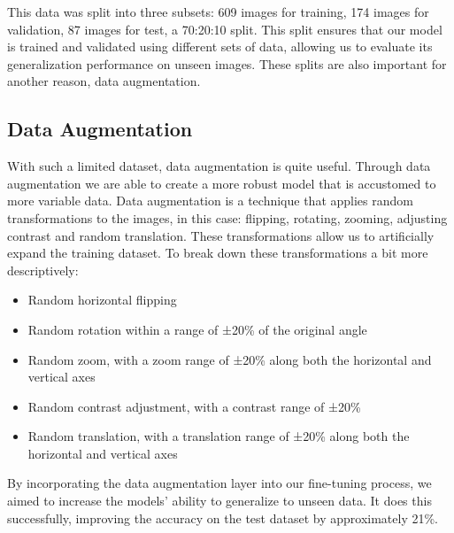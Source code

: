 \documentclass[12pt]{article}
\begin{document}
This data was split into three subsets: 609 images for training, 174 images for validation, 87 images for test, a 70:20:10 split.
This split ensures that our model is trained and validated using different sets of data, allowing us to evaluate its generalization
performance on unseen images. These splits are also important for another reason, data augmentation.\\

\subsection{Data Augmentation}
With such a limited dataset, data augmentation is quite useful. Through data augmentation we are able to create a more robust model that 
is accustomed to more variable data. Data augmentation is a technique that applies random transformations to the images, in this case:
flipping, rotating, zooming, adjusting contrast and random translation. These transformations allow us to artificially expand the training dataset. 
To break down these transformations a bit more descriptively:
\begin{itemize}
    \item Random horizontal flipping
    \item Random rotation within a range of ±20\% of the original angle
    \item Random zoom, with a zoom range of ±20\% along both the horizontal and vertical axes
    \item Random contrast adjustment, with a contrast range of ±20\%
    \item Random translation, with a translation range of ±20\% along both the horizontal and vertical axes
\end{itemize}

By incorporating the data augmentation layer into our fine-tuning process, we aimed to increase the models' ability to 
generalize to unseen data. It does this successfully, improving the accuracy on the test dataset by approximately 21\%. \\
\end{document}
